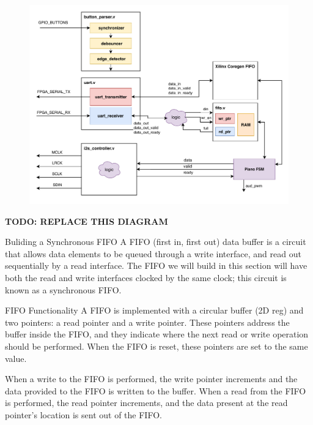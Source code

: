 \documentclass[11pt]{article}
\makeatletter
\renewcommand{\section}
{\@startsection {section}{1}{0pt}
 {-2ex}
 {1ex}
 {\bfseries\Large}}
\renewcommand{\subsection}
{\@startsection {subsection}{1}{0pt}
 {-1ex}
 {0.5ex}
 {\bfseries\normalsize}}
\makeatother
\begin{document}
\begin{figure}[H]
    \centerline{\includegraphics[width=\textwidth]{Lab6_Block_Diagram.pdf}}
\end{figure}
\textbf{TODO: REPLACE THIS DIAGRAM}

\section{Buliding a Synchronous FIFO}
A FIFO (first in, first out) data buffer is a circuit that allows data elements to be queued through a write interface, and read out sequentially by a read interface.
The FIFO we will build in this section will have both the read and write interfaces clocked by the same clock; this circuit is known as a synchronous FIFO.

\subsection{FIFO Functionality}
A FIFO is implemented with a circular buffer (2D reg) and two pointers: a read pointer and a write pointer.
These pointers address the buffer inside the FIFO, and they indicate where the next read or write operation should be performed.
When the FIFO is reset, these pointers are set to the same value.

When a write to the FIFO is performed, the write pointer increments and the data provided to the FIFO is written to the buffer.
When a read from the FIFO is performed, the read pointer increments, and the data present at the read pointer's location is sent out of the FIFO.
\end{document}
